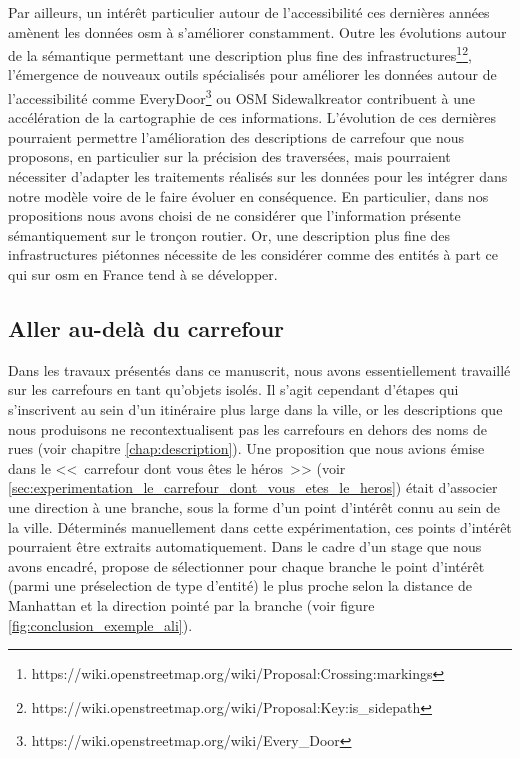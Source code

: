 Par ailleurs, un intérêt particulier autour de l'accessibilité ces dernières années amènent les données \gls{osm} à s'améliorer constamment. Outre les évolutions autour de la sémantique permettant une description plus fine des infrastructures\footnote{https://wiki.openstreetmap.org/wiki/Proposal:Crossing:markings}\footnote{https://wiki.openstreetmap.org/wiki/Proposal:Key:is\_sidepath}, l'émergence de nouveaux outils spécialisés pour améliorer les données autour de l'accessibilité comme EveryDoor\footnote{https://wiki.openstreetmap.org/wiki/Every\_Door} ou OSM Sidewalkreator \citep{demoraesvestena2023} contribuent à une accélération de la cartographie de ces informations. L'évolution de ces dernières pourraient permettre l'amélioration des descriptions de carrefour que nous proposons, en particulier sur la précision des traversées, mais pourraient nécessiter d'adapter les traitements réalisés sur les données pour les intégrer dans notre modèle voire de le faire évoluer en conséquence. En particulier, dans nos propositions nous avons choisi de ne considérer que l'information présente sémantiquement sur le tronçon routier. Or, une description plus fine des infrastructures piétonnes nécessite de les considérer comme des entités à part ce qui sur \gls{osm} en France tend à se développer.

\subsection{Aller au-delà du carrefour}

Dans les travaux présentés dans ce manuscrit, nous avons essentiellement travaillé sur les carrefours en tant qu'objets isolés. Il s'agit cependant d'étapes qui s'inscrivent au sein d'un itinéraire \citep{gaunet_verbal_2006} plus large dans la ville, or les descriptions que nous produisons ne recontextualisent pas les carrefours en dehors des noms de rues (voir chapitre \ref{chap:description}). Une proposition que nous avions émise dans le <<~carrefour dont vous êtes le héros~>> (voir \ref{sec:experimentation_le_carrefour_dont_vous_etes_le_heros}) était d'associer une direction à une branche, sous la forme d'un point d'intérêt connu au sein de la ville. Déterminés manuellement dans cette expérimentation, ces points d'intérêt pourraient être extraits automatiquement. Dans le cadre d'un stage que nous avons encadré, \citet{aouini2023} propose de sélectionner pour chaque branche le point d'intérêt (parmi une préselection de type d'entité) le plus proche selon la distance de Manhattan et la direction pointé par la branche (voir figure \ref{fig:conclusion_exemple_ali}).

